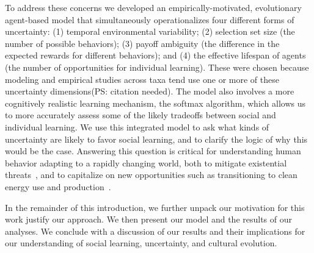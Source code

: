 \documentclass[letterpaper,11.5pt]{scrartcl}
\newcommand{\mt}[1]{{\textcolor{myorange} {({\tiny MT:} #1)}}}
\newcommand{\cm}[1]{{\textcolor{mypurple} {({\tiny CM:} #1)}}}
\newcommand{\ps}[1]{{\textcolor{mygreen} {({\tiny PS:} #1)}}}
\begin{document}
To address these concerns we developed an empirically-motivated, evolutionary agent-based model that simultaneously operationalizes four %
different forms of uncertainty: (1) temporal environmental variability; (2) selection set size (the number of possible behaviors); (3) payoff ambiguity (the difference in the expected rewards for different behaviors); and (4) the effective lifespan of agents (the number of opportunities for individual learning). These were chosen because modeling and empirical 
studies across taxa tend use one or more of these uncertainty dimensions\ps{citation needed}.  
The model also involves a more cognitively realistic learning mechanism, the softmax algorithm, which allows us to more accurately assess some of the likely tradeoffs between social and individual learning. We use this integrated model to ask what kinds of uncertainty are likely to favor social learning, and to clarify the logic of why this would be the case. Answering this question is critical for understanding human behavior adapting to a rapidly changing world, both to mitigate existential threats~\cite{Moya2020,Jones2021}, and to capitalize on new opportunities such as transitioning to clean energy use and production~\cite{NatureEnergyEditorialPromisesPremises2018,Brisbois2022}.

In the remainder of this introduction, we further unpack our motivation for this work justify our approach. We then present our model and the results of our analyses. We conclude with a discussion of our results and their implications for our understanding of social learning, uncertainty, and cultural evolution. 

\end{document}
